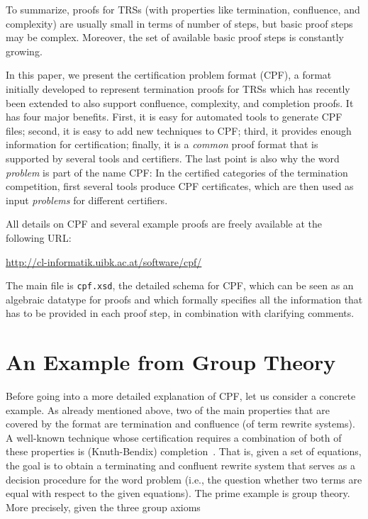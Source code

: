 \documentclass[USenglish]{eptcs}
\begin{document}
To summarize, proofs for TRSs (with properties like termination, confluence, and
complexity) are usually small in terms of number of steps, but basic proof steps
may be complex. Moreover, the set of available basic proof steps is constantly
growing. 

In this paper, we present the certification problem
format (CPF), a format initially developed to represent termination proofs for TRSs which
has recently been extended to also support confluence, complexity, and completion proofs.
It has four major benefits.
First, it is easy for automated tools to generate CPF files; second,
it is easy to add new techniques to CPF; third, it provides enough
information for certification; finally, it is 
a \emph{common} proof format that is supported by several tools and 
certifiers.
The last point is also why the word \emph{problem} is part of the name CPF: In
the certified categories of the termination competition, first several tools
produce CPF certificates, which are then used as input \emph{problems} for
different certifiers.

All details on CPF and several example proofs are freely available at the following URL:
\begin{center}
\url{http://cl-informatik.uibk.ac.at/software/cpf/}
\end{center}
The main file is \texttt{cpf.xsd}, the detailed schema for CPF,
which can be seen as an algebraic
datatype for proofs and which formally specifies all the information that has to be provided
in each proof step, in combination with clarifying comments. 


\section{An Example from Group Theory}
\label{example}
Before going into a more detailed explanation of CPF, let us consider a concrete
example. As already mentioned above, two of the main properties that are covered by the
format are termination and confluence (of term rewrite systems). A well-known
technique whose certification requires a combination of both of these properties
is (Knuth-Bendix) completion~\cite{KB70}. That is, given a set of equations, the goal is to
obtain a terminating and confluent rewrite system that serves as a decision
procedure for the word problem (i.e., the question whether two terms are equal
with respect to the given equations). The prime example is group theory. More
precisely, given the three group axioms
\end{document}
